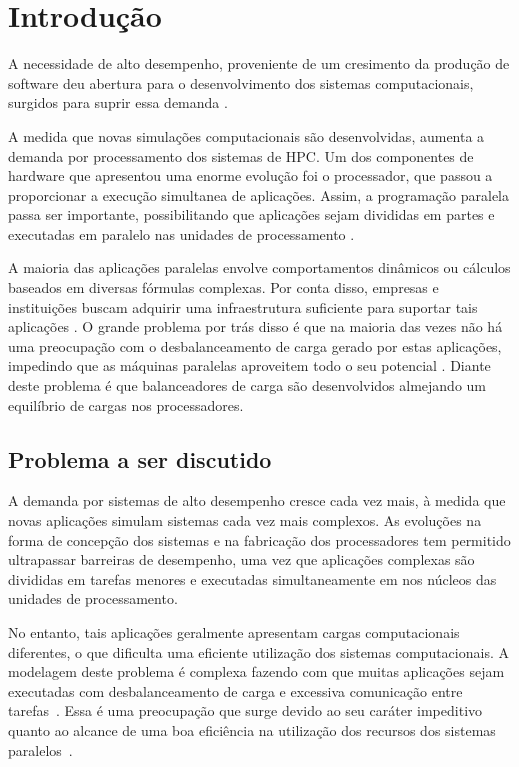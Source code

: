 \chapter{Introdução  \label{cap:introducao}}

A necessidade de alto desempenho, proveniente de um cresimento da produção de software deu abertura para o desenvolvimento dos sistemas computacionais, surgidos para suprir essa demanda \cite{artigoSalao2017}.

A medida que novas simulações computacionais são desenvolvidas, aumenta a demanda por processamento dos sistemas de HPC. Um dos componentes de hardware que apresentou uma enorme evolução foi o processador, que passou a proporcionar a execução simultanea de aplicações. Assim, a programação paralela passa ser importante, possibilitando que aplicações sejam divididas em partes e executadas em paralelo nas unidades de processamento \cite{pilla2015programaccao}.

A maioria das aplicações paralelas envolve comportamentos dinâmicos ou cálculos baseados em diversas fórmulas complexas. Por conta disso, empresas e instituições buscam adquirir uma infraestrutura suficiente para suportar tais aplicações \cite{arruda2015balanceamento}. O grande problema por trás disso é que na maioria das vezes não há uma preocupação com o desbalanceamento de carga gerado por estas aplicações, impedindo que as máquinas paralelas aproveitem todo o seu potencial \cite{padoin2014balanceamento}. Diante deste problema é que balanceadores de carga são desenvolvidos almejando um equilíbrio de cargas nos processadores.



\section{Problema a ser discutido}

A demanda por sistemas de alto desempenho cresce cada vez mais, à medida que novas aplicações simulam sistemas cada vez mais complexos. As evoluções na forma de concepção dos sistemas e na fabricação dos processadores tem permitido ultrapassar barreiras de desempenho, uma vez que aplicações complexas são divididas em tarefas menores e executadas simultaneamente em nos núcleos das unidades de processamento. 

No entanto, tais aplicações geralmente apresentam cargas computacionais diferentes, o que dificulta uma eficiente utilização dos sistemas computacionais. A modelagem deste problema é complexa fazendo com que muitas aplicações sejam executadas com desbalanceamento de carga e excessiva comunicação entre tarefas~\cite{pilla2015programaccao, padoin2017ICCS}. Essa é uma preocupação que surge devido ao seu caráter impeditivo quanto ao alcance de uma boa eficiência na utilização dos recursos dos sistemas paralelos~\cite{padoin2014saving}.

